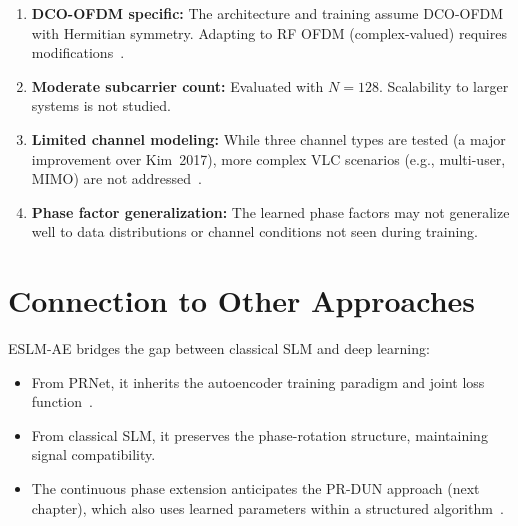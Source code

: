 \begin{enumerate}
    \item \textbf{DCO-OFDM specific:}
          The architecture and training assume DCO-OFDM with Hermitian
          symmetry.  Adapting to RF OFDM (complex-valued) requires
          modifications~\cite{hao2019extended}.

    \item \textbf{Moderate subcarrier count:}
          Evaluated with $N=128$.  Scalability to larger systems is not studied.

    \item \textbf{Limited channel modeling:}
          While three channel types are tested (a major improvement over
          Kim~2017), more complex VLC scenarios (e.g., multi-user, MIMO)
          are not addressed~\cite{hao2019extended}.

    \item \textbf{Phase factor generalization:}
          The learned phase factors may not generalize well to data
          distributions or channel conditions not seen during training.
\end{enumerate}


\section{Connection to Other Approaches}
\label{sec:eslm_connections}

ESLM-AE bridges the gap between classical SLM and deep learning:
\begin{itemize}
    \item From PRNet, it inherits the autoencoder training paradigm
          and joint loss function~\cite{kim2017novel}.
    \item From classical SLM, it preserves the phase-rotation structure,
          maintaining signal compatibility.
    \item The continuous phase extension anticipates the PR-DUN approach
          (next chapter), which also uses learned parameters within a
          structured algorithm~\cite{nguyen2022deep}.
\end{itemize}
